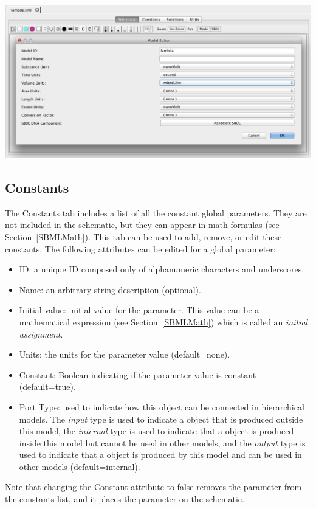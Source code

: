 \documentclass[titlepage,11pt]{article}
\begin{document}
\begin{center}
\includegraphics[width=160mm]{screenshots/ModelUnits}
\end{center}

\subsection{\label{Constants}Constants}

\noindent
The Constants tab includes a list of all the constant global parameters.  They are not included in the schematic, but they can appear in math formulas (see Section~\ref{SBMLMath}).  This tab can be used to add, remove, or edit these constants.  The following attributes can be edited for a global parameter:
\begin{itemize}
\item ID: a unique ID composed only of alphanumeric characters and underscores.
\item Name: an arbitrary string description (optional).
\item Initial value: initial value for the parameter.  This value can be a mathematical expression (see Section~\ref{SBMLMath}) which is called an \emph{initial assignment}.
\item Units: the units for the parameter value (default=none).
\item Constant: Boolean indicating if the parameter value is constant (default=true).
\item Port Type: used to indicate how this object can be connected in hierarchical models.  The \emph{input} type is used to indicate a object that is produced outside this model, the \emph{internal} type is used to indicate that a object is produced inside this model but cannot be used in other models, and the \emph{output} type is used to indicate that a object is produced by this model and can be used in other models (default=internal). 
\end{itemize}
Note that changing the Constant attribute to false removes the parameter from the constants list, and it places the parameter on the schematic.
\end{document}
